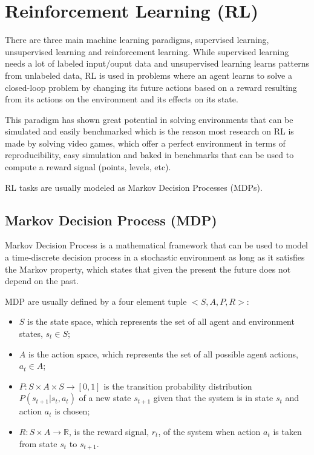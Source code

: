 
\section{Reinforcement Learning (RL)} \label{section:RL}
\noindent There are three main machine learning paradigms, supervised learning, unsupervised learning and reinforcement learning. While supervised learning needs a lot of labeled input/ouput data and unsupervised learning learns patterns from unlabeled data, \acrfull{RL} is used in problems where an agent learns to solve a closed-loop problem by changing its future actions based on a reward resulting from its actions on the environment and its effects on its state.

This paradigm has shown great potential in solving environments that can be simulated and easily benchmarked which is the reason most research on \acrshort{RL} is made by solving video games, which offer a perfect environment in terms of reproducibility, easy simulation and baked in benchmarks that can be used to compute a reward signal (points, levels, etc).

\acrshort{RL} tasks are usually modeled as Markov Decision Processes (\acrshort{MDP}s).

\subsection{Markov Decision Process (MDP)}
\noindent Markov Decision Process is a mathematical framework that can be used to model a time-discrete decision process in a stochastic environment as long as it satisfies the Markov property, which states that given the present the future does not depend on the past.

\acrshort{MDP} are usually defined by a four element tuple $<S, A, P, R>$:
\begin{itemize}
    \item $S$ is the state space, which represents the set of all agent and environment states, $s_t \in S$;
    \item $A$ is the action space, which represents the set of all possible agent actions, $a_t \in A$;
    \item $P:S \times A \times S \rightarrow [0, 1]$ is the transition probability distribution $P(s_{t+1}|s_t,a_t)$ of a new state $s_{t+1}$ given that the system is in state $s_t$ and action $a_t$ is chosen;
    \item $R:S\times A \rightarrow \mathbb{R}$, is the reward signal, $r_t$, of the system when action $a_t$ is taken from state $s_t$ to $s_{t+1}$.
\end{itemize}

